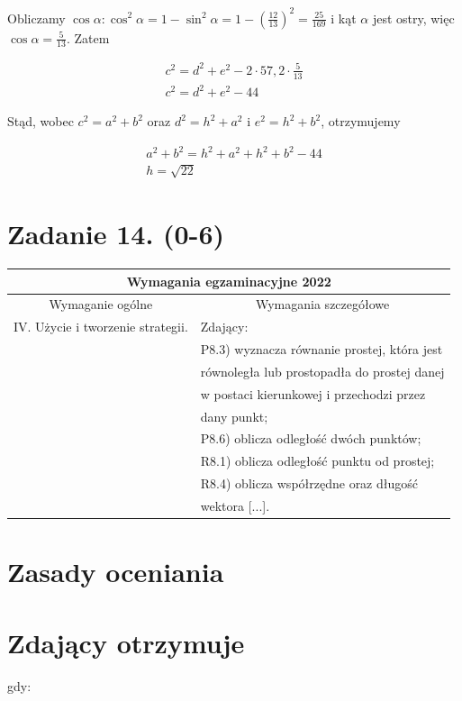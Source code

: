 \documentclass[10pt]{article}
\begin{document}
Obliczamy $\cos \alpha: \cos ^{2} \alpha=1-\sin ^{2} \alpha=1-\left(\frac{12}{13}\right)^{2}=\frac{25}{169}$ i kąt $\alpha$ jest ostry, więc $\cos \alpha=\frac{5}{13}$. Zatem

$$
\begin{gathered}
c^{2}=d^{2}+e^{2}-2 \cdot 57,2 \cdot \frac{5}{13} \\
c^{2}=d^{2}+e^{2}-44
\end{gathered}
$$

Stąd, wobec $c^{2}=a^{2}+b^{2}$ oraz $d^{2}=h^{2}+a^{2}$ i $e^{2}=h^{2}+b^{2}$, otrzymujemy

$$
\begin{gathered}
a^{2}+b^{2}=h^{2}+a^{2}+h^{2}+b^{2}-44 \\
h=\sqrt{22}
\end{gathered}
$$

\section*{Zadanie 14. (0-6)}
\begin{center}
\begin{tabular}{|l|l|}
\hline
\multicolumn{2}{|c|}{Wymagania egzaminacyjne 2022} \\
\hline
\multicolumn{1}{|c|}{Wymaganie ogólne} & \multicolumn{1}{c|}{Wymagania szczegółowe} \\
\hline
IV. Użycie i tworzenie strategii. & Zdający: \\
 & P8.3) wyznacza równanie prostej, która jest \\
 & równoległa lub prostopadła do prostej danej \\
 & w postaci kierunkowej i przechodzi przez \\
 & dany punkt; \\
 & P8.6) oblicza odległość dwóch punktów; \\
 & R8.1) oblicza odległość punktu od prostej; \\
 & R8.4) oblicza współrzędne oraz długość \\
 & wektora [...]. \\
\hline
\end{tabular}
\end{center}

\section*{Zasady oceniania}
\section*{Zdający otrzymuje}
gdy:
\end{document}
